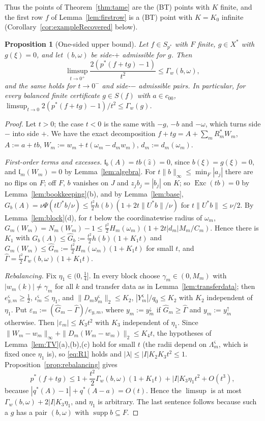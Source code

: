 \documentclass[10pt]{amsart}
\newtheorem{proposition}[theorem]{Proposition}
\theoremstyle{definition}
\theoremstyle{remark}
\newcommand{\supp}{\operatorname{supp}}
\newcommand{\zh}{\hat z}
\newcommand{\lin}{\mathfrak l}
\newcommand{\Exc}{\operatorname{Exc}}
\begin{document}
Thus the points of Theorem~\ref{thm:tame} are the \textup{(BT)} points with
$K$ finite, and the first row $f$ of Lemma~\ref{lem:firstrow} is a
\textup{(BT)} point with $K=K_0$ infinite
(Corollary~\ref{cor:exampleRecovered} below).

\begin{proposition}[One-sided upper bound]\label{prop:onesidedupper}
Let $f\in S_{p^*}$ with $F$ finite, $g\in X^*$ with $g(\xi)=0$, and let
$(b,\omega)$ be side-$+$ admissible for $g$.  Then
\[
 \limsup_{t\to0^+}\frac{2(p^*(f+tg)-1)}{t^2}\le\Gamma_w(b,\omega),
\]
and the same holds for $t\to0^-$ and side-$-$ admissible pairs.  In
particular, for every balanced finite certificate $g\in S(f)$ with
$a\in c_{00}$, $\limsup_{t\to0}2(p^*(f+tg)-1)/t^2\le\Gamma_w(g)$.
\end{proposition}

\begin{proof}
Let $t>0$; the case $t<0$ is the same with $-g$, $-b$ and $-\omega$, which
turns side $-$ into side $+$.  We have the exact decomposition
$f+tg=A+\sum_mR_m^*W_m$, $A:=a+tb$, $W_m:=w_m+t(\omega_m-d_mw_m)$,
$d_m:=d_m(\omega_m)$.

\emph{First-order terms and excesses.}  $\lin_b(A)=tb(\zh)=0$, since
$b(\xi)=g(\xi)=0$, and $\lin_m(W_m)=0$ by Lemma~\ref{lem:algebra}.  For
$t\|b\|_\infty\le\min_F|a_j|$ there are no flips on $F$; off $F$, $b$
vanishes on $J$ and $z_jb_j=|b_j|$ on $K$; so $\Exc(tb)=0$ by
Lemma~\ref{lem:bookkeeping}(b), and by Lemma~\ref{lem:base},
$G_b(A)=\nu\Psi(tU^*b/\nu)\le\frac{t^2}2h(b)(1+2t\|U^*b\|/\nu)$ for
$t\|U^*b\|\le\nu/2$.  By Lemma~\ref{lem:block}(d), for $t$ below the
coordinatewise radius of $\omega_m$,
$G_m(W_m)=N_m(W_m)-1\le\frac{t^2}2H_m(\omega_m)(1+2t|d_m|M_m/C_m)$.  Hence
there is $K_1$ with $G_b(A)\le\hat G_b:=\frac{t^2}2h(b)(1+K_1t)$ and
$G_m(W_m)\le\hat G_m:=\frac{t^2}2H_m(\omega_m)(1+K_1t)$ for small $t$, and
$\hat\Gamma=\frac{t^2}2\Gamma_w(b,\omega)(1+K_1t)$.

\emph{Rebalancing.}  Fix $\eta_1\in(0,\frac14]$.  In every block choose
$\gamma_m\in(0,M_m)$ with $|w_m(k)|\ne\gamma_m$ for all $k$ and transfer
data as in Lemma~\ref{lem:transferdata}; then $e^\varsigma_{y,m}\ge
\frac12$, $\iota^\varsigma_m\le\eta_1$, and $\|D_my^\varsigma_m\|_2\le K_2$,
$|Y^\varsigma_m|/q_0\le K_2$ with $K_2$ independent of $\eta_1$.  Put
$\varepsilon_m:=(\hat G_m-\hat\Gamma)/e_{y,m}$, where $y_m:=y^\downarrow_m$
if $\hat G_m\ge\hat\Gamma$ and $y_m:=y^\uparrow_m$ otherwise.  Then
$|\varepsilon_m|\le K_3t^2$ with $K_3$ independent of $\eta_1$.  Since
$\|W_m-w_m\|_\infty+\|D_m(W_m-w_m)\|_2\le K_4t$, the hypotheses of
Lemma~\ref{lem:TV}(a),(b),(c) hold for small $t$ (the radii depend on
$\Lambda^\varsigma_m$, which is fixed once $\eta_1$ is), so \eqref{eq:R1}
holds and $|\lambda|\le|I|K_2K_3t^2\le1$.  Proposition~\ref{prop:rebalancing}
gives
\[
 p^*(f+tg)\le1+\frac{t^2}2\Gamma_w(b,\omega)(1+K_1t)+|I|K_3\eta_1t^2+O(t^3),
\]
because $|q^*(A)-1|+q^*(A-a)=O(t)$.  Hence the $\limsup$ is at most
$\Gamma_w(b,\omega)+2|I|K_3\eta_1$, and $\eta_1$ is arbitrary.  The last
sentence follows because such a $g$ has a pair $(b,\omega)$ with $\supp
b\subseteq F$.
\end{proof}
\end{document}
